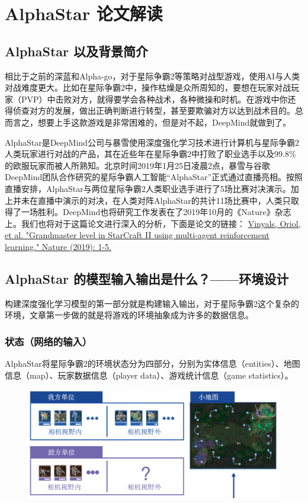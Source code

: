 \section{AlphaStar 论文解读}
 

\subsection{AlphaStar 以及背景简介} 

相比于之前的深蓝和Alpha-go，对于星际争霸2等策略对战型游戏，使用AI与人类对战难度更大。比如在星际争霸2中，操作枯燥是众所周知的，要想在玩家对战玩家（PVP）中击败对方，就得要学会各种战术，各种微操和时机。在游戏中你还得侦查对方的发展，做出正确判断进行转型，甚至要欺骗对方以达到战术目的。总而言之，想要上手这款游戏是非常困难的，但是对不起，DeepMind就做到了。

AlphaStar是DeepMind公司与暴雪使用深度强化学习技术进行计算机与星际争霸2人类玩家进行对战的产品，其在近些年在星际争霸2中打败了职业选手以及99.8\%的欧服玩家而被人所熟知。北京时间2019年1月25日凌晨2点，暴雪与谷歌DeepMind团队合作研究的星际争霸人工智能“AlphaStar”正式通过直播亮相。按照直播安排，AlphaStar与两位星际争霸2人类职业选手进行了5场比赛对决演示。加上并未在直播中演示的对决，在人类对阵AlphaStar的共计11场比赛中，人类只取得了一场胜利。DeepMind也将研究工作发表在了2019年10月的《Nature》杂志上。我们也将对于这篇论文进行深入的分析，下面是论文的链接：
\href{https://www.nature.com/articles/s41586-019-1724-z?}{Vinyals, Oriol, et al. "Grandmaster level in StarCraft II using multi-agent reinforcement learning." Nature (2019): 1-5.}

\subsection{AlphaStar 的模型输入输出是什么？——环境设计} 

构建深度强化学习模型的第一部分就是构建输入输出，对于星际争霸2这个复杂的环境，文章第一步做的就是将游戏的环境抽象成为许多的数据信息。

\subsubsection{状态（网络的输入）} 

AlphaStar将星际争霸2的环境状态分为四部分，分别为实体信息（entities）、地图信息（map）、玩家数据信息（player data）、游戏统计信息（game statistics）。

\begin{figure}[htpb]
    \centering
    \includegraphics[width=0.7\linewidth]{res/ch13/13.1}
    \caption{}
    \label{fig:}
\end{figure}

